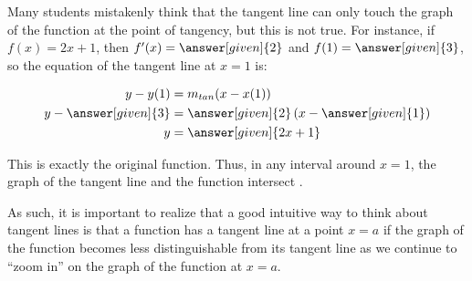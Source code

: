 \documentclass[nooutcomes]{ximera}
\begin{document}
\begin{warning}
Many students mistakenly think that the tangent line can only touch
the graph of the function at the point of tangency, but this is not
true.  For instance, if $f(x) = 2x+1$, then $f'(x) = \answer[given]{2}$ and
$f(1) = \answer[given]{3}$, so the equation of the tangent line at
$x=1$ is:

\begin{align*}
y-y(1) &= m_{tan}(x-x(1)) \\
y - \answer[given]{3} &= \answer[given]{2}\left(x-\answer[given]{1}\right) \\
y &= \answer[given]{2x+1}
\end{align*}

This is exactly the original function.  Thus, in any interval around $x=1$, the graph of the tangent line and the function intersect .

As such, it is important to realize that a good intuitive way to think about tangent lines is that a function has a tangent line at a point $x=a$ if the graph of the function becomes less distinguishable from its tangent line as we continue to ``zoom in'' on the graph of the function at $x=a$.
\end{warning}
\end{document}
